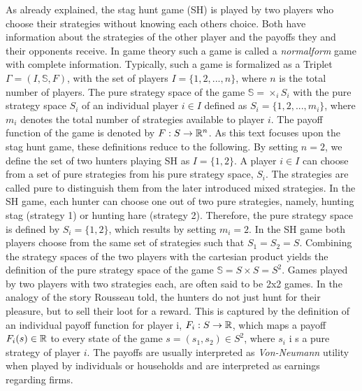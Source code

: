 \label{sec:traditional}
As already explained, the stag hunt game (SH) is played by 
two players who choose their
strategies without knowing each others choice.
Both have information about the strategies of the
other player and the payoffs they and their opponents receive. In game theory
such a game is called a \textit{normalform} game with complete information. 
Typically, such a game is formalized as a Triplet $\Gamma = (I,\mathbb{S},F)$, 
with the set of players $I=\{1,2,...,n\}$, where $n$ is the 
total number of players. The pure strategy space of the game 
$\mathbb{S} = \times_i S_i$ with the pure strategy space $S_i$ of an 
individual player  $i \in I$ defined as $S_i = \{1,2,...,m_i\}$, where $m_i$ 
denotes the total number of strategies available to player $i$. The payoff 
function of the game is denoted by $F: S \rightarrow \mathbb{R}^n$.
As this text focuses upon the stag hunt game, these definitions reduce to the 
following.
By setting $n=2$, we define the set of two hunters playing SH as $I=\{1,2\}$. A 
player $i \in I$  can choose from a set of pure strategies from his 
pure strategy space, $S_i$. The strategies are called pure to distinguish
them from the later introduced mixed strategies. 
In the SH game, each hunter can choose one out of two pure strategies, namely, 
hunting stag (strategy 1) or hunting hare (strategy 2).
Therefore, the pure strategy space is defined by $S_i = \{1,2\}$, which results
by setting $m_i=2$. In the SH game both players choose from
the same set of strategies such that $S_1 =S_2=S$. Combining the strategy spaces
of the two players with the cartesian product
yields the definition of the pure strategy space of the game
$\mathbb{S}= S \times S = S^2$. Games played by two players with two strategies
each, are often said to be 2x2 games.    
In the analogy of the story Rousseau told, the hunters do not just hunt
for their pleasure, but to sell their loot for a reward. 
This is captured by the definition of an individual payoff function for player
i, $F_i:S \rightarrow \mathbb{R}$, which maps a payoff $F_i(s) \in \mathbb{R}$ 
to every state of the game $s=(s_1,s_2) \in S^2$, where $s_i$ i s a pure
strategy of player $i$.
The payoffs are usually interpreted as \textit{Von-Neumann} utility when 
played by individuals or households and are interpreted as earnings regarding 
firms. 

